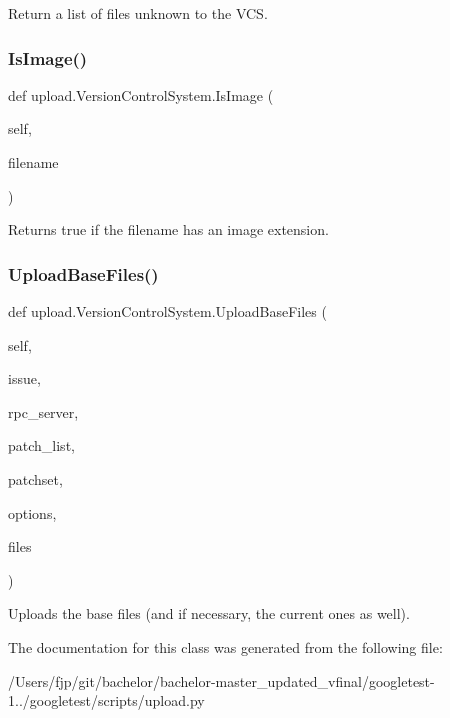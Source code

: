 \begin{DoxyVerb}Return a list of files unknown to the VCS.\end{DoxyVerb}
 \mbox{\label{classupload_1_1_version_control_system_a846889ecd2ef40870b456ddb5b349e02}} 
\subsubsection{\texorpdfstring{Is\+Image()}{IsImage()}}
{\footnotesize\ttfamily def upload.\+Version\+Control\+System.\+Is\+Image (\begin{DoxyParamCaption}\item[{}]{self,  }\item[{}]{filename }\end{DoxyParamCaption})}

\begin{DoxyVerb}Returns true if the filename has an image extension.\end{DoxyVerb}
 \mbox{\label{classupload_1_1_version_control_system_a7e334f967301b9e85e5a9c39f5036823}} 
\subsubsection{\texorpdfstring{Upload\+Base\+Files()}{UploadBaseFiles()}}
{\footnotesize\ttfamily def upload.\+Version\+Control\+System.\+Upload\+Base\+Files (\begin{DoxyParamCaption}\item[{}]{self,  }\item[{}]{issue,  }\item[{}]{rpc\+\_\+server,  }\item[{}]{patch\+\_\+list,  }\item[{}]{patchset,  }\item[{}]{options,  }\item[{}]{files }\end{DoxyParamCaption})}

\begin{DoxyVerb}Uploads the base files (and if necessary, the current ones as well).\end{DoxyVerb}
 

The documentation for this class was generated from the following file\+:\begin{DoxyCompactItemize}
\item 
/\+Users/fjp/git/bachelor/bachelor-\/master\+\_\+updated\+\_\+vfinal/googletest-\/1../googletest/scripts/upload.\+py\end{DoxyCompactItemize}
